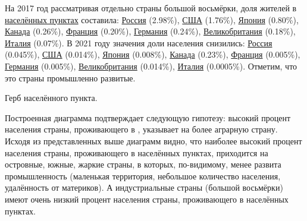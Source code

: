 На 2017 год рассматривая отдельно страны большой восьмёрки, доля жителей в \href{http://www.wikidata.org/entity/Q486972}{населённых пунктах} составила: \href{http://www.wikidata.org/entity/Q159}{Россия} (\num{2.98}\%), \href{http://www.wikidata.org/entity/Q30}{США} (\num{1.76}\%), \href{http://www.wikidata.org/entity/Q17}{Япония} (\num{0.80}\%), \href{http://www.wikidata.org/entity/Q16}{Канада} (\num{0.26}\%), \href{http://www.wikidata.org/entity/Q142}{Франция} (\num{0.20}\%), \href{http://www.wikidata.org/entity/Q183}{Германия} (\num{0.24}\%), \href{http://www.wikidata.org/entity/Q145}{Великобритания} (\num{0.18}\%), \href{http://www.wikidata.org/entity/Q38}{Италия} (\num{0.07}\%). В 2021 году значения доли населения снизились: \href{http://www.wikidata.org/entity/Q159}{Россия} (0.045\%), \href{http://www.wikidata.org/entity/Q30}{США} (\num{0.014}\%), \href{http://www.wikidata.org/entity/Q17}{Япония} (\num{0.008}\%), \href{http://www.wikidata.org/entity/Q16}{Канада} (\num{0.23}\%), \href{http://www.wikidata.org/entity/Q142}{Франция} (\num{0.005}\%), \href{http://www.wikidata.org/entity/Q183}{Германия} (\num{0.005}\%), \href{http://www.wikidata.org/entity/Q145}{Великобритания} (\num{0.014}\%), \href{http://www.wikidata.org/entity/Q38}{Италия} (\num{0.0005}\%). Отметим, что это страны промышленно развитые.

\begin{marginfigure}[0.0cm]
{
\setlength{\fboxsep}{0pt}%
\setlength{\fboxrule}{1pt}%
%
}
  \caption{Герб населённого пункта.}%
  \label{fig:flag_question_human_settlements4}%
\end{marginfigure}


Построенная диаграмма подтверждает следующую гипотезу: высокий процент населения страны, проживающего в , указывает на более аграрную страну. Исходя из представленных выше диаграмм видно, что наиболее высокий процент населения страны, проживающего в населённых пунктах, приходится на островные, южные, жаркие страны, в которых, по-видимому, менее развита промышленность (маленькая территория, небольшое количество населения, удалённость от материков). А индустриальные страны (большой восьмёрки) имеют очень низкий процент населения страны, проживающего в населённых пунктах.

